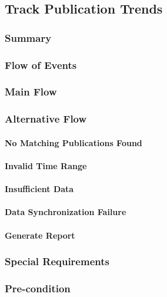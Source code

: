 \subsection{Track Publication Trends}
\subsubsection{Summary}

\subsubsection{Flow of Events}
\subsubsection*{Main Flow}

\subsubsection*{Alternative Flow}
\paragraph{No Matching Publications Found}

\paragraph{Invalid Time Range}

\paragraph{Insufficient Data}

\paragraph{Data Synchronization Failure}

\paragraph{Generate Report}

\subsubsection{Special Requirements}

\subsubsection{Pre-condition}

